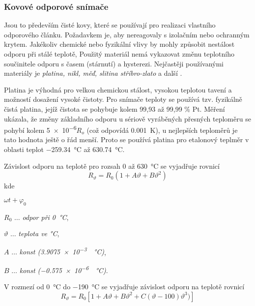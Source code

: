           \subsubsection{Kovové odporové snímače} 
            Jsou to především čisté kovy, které se používají pro realizaci vlastního odporového
            článku. Požadavkem je, aby nereagovaly s izolačním nebo ochranným krytem. Jakékoliv
            chemické nebo fyzikální vlivy by mohly způsobit nestálost odporu při stálé teplotě,
            Použitý materiál nemá vykazovat změnu teplotního součinitele odporu s časem (stárnutí) a
            hysterezi. Nejčastěji používanými materiály je \emph{platina, nikl, měď, slitina
            stříbro-zlato} a další \cite[s.~96]{Zehnula1983}.
             
            Platina je výhodná pro velkou chemickou stálost, vysokou teplotou tavení a možností
            dosažení vysoké čistoty. Pro snímače teploty se používá tzv. fyzikálně  čistá platina,
            jejíž čistota se pohybuje kolem 99,93 až 99,99 \% Pt. Měření ukázala, že změny
            základního odporu u sériově vyráběných přesných teploměru se pohybí kolem
            \num{5e-6}$R_o$ (což odpovídá \SI{0.001}{\kelvin}), u nejlepších teploměrů je tato
            hodnota ještě o řád menší. Proto se používá platina pro etalonový teplměr v oblasti
            teplot \SI{-259.34}{\degreeCelsius} až \SI{630.74}{\degreeCelsius}.
            
            Závislost odporu na teplotě pro rozsah \num{0} až \SI{630}{\degreeCelsius} se vyjadřuje
            rovnicí
            \begin{equation}\label{SAC:kov_Ro1}
              R_\vartheta = R_0(1 + A\vartheta + B\vartheta^2)
            \end{equation}
            kde 
            \begin{labeling}{$\omega t+\varphi_0$}
              \setlength{\itemindent}{2cm}
              \item[\(R_0\)]          \(\ldots\) \emph{odpor při \SI{0}{\degreeCelsius}}, 
              \item[\(\vartheta\)]    \(\ldots\) \emph{teplota ve \si{\degreeCelsius}}, 
              \item[\(A\)]            \(\ldots\) \emph{konst (\SI{3.9075e-3}{\per\degreeCelsius})},
              \item[\(B\)]            \(\ldots\) \emph{konst (\SI{-0.575e-6}{\per\degreeCelsius})}. 
            \end{labeling}
 
             V rozmezí od \SI{0}{\degreeCelsius} do \SI{-190}{\degreeCelsius} se vyjadřuje
             závislost odporu na teplotě rovnicí
             \begin{equation}\label{SAC:kov_Ro2}
               R_\vartheta = R_0[1 + A\vartheta + B\vartheta^2 + C(\vartheta - 100)\vartheta^3)]
             \end{equation}

